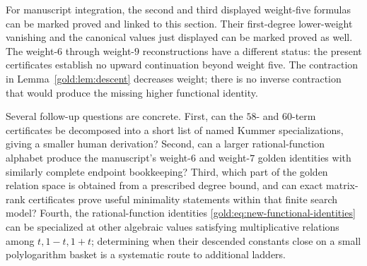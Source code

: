 For manuscript integration, the second and third displayed weight-five
formulas can be marked proved and linked to this section.  Their
first-degree lower-weight vanishing and the canonical values just
displayed can be marked proved as well.  The weight-$6$ through
weight-$9$ reconstructions have a different status: the present
certificates establish no upward continuation beyond weight five.
The contraction in Lemma~\ref{gold:lem:descent} decreases weight;
there is no inverse contraction that would produce the missing higher
functional identity.

Several follow-up questions are concrete.  First, can the $58$- and
$60$-term certificates be decomposed into a short list of named Kummer
specializations, giving a smaller human derivation?  Second, can a
larger rational-function alphabet produce the manuscript's weight-$6$
and weight-$7$ golden identities with similarly complete endpoint
bookkeeping?  Third, which part of the golden relation space is obtained
from a prescribed degree bound, and can exact matrix-rank certificates
prove useful minimality statements within that finite search model?
Fourth, the rational-function identities
\eqref{gold:eq:new-functional-identities} can be specialized at other
algebraic values satisfying multiplicative relations among
$t,1-t,1+t$; determining when their descended constants close on a
small polylogarithm basket is a systematic route to additional ladders.
